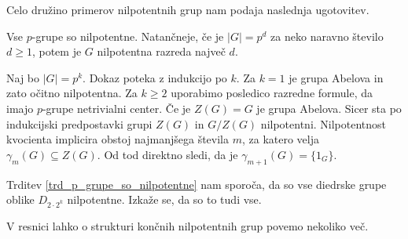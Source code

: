 Celo družino primerov nilpotentnih grup nam podaja naslednja ugotovitev.
\begin{trditev}
\label{trd_p_grupe_so_nilpotentne}
    Vse $p$-grupe so nilpotentne. Natančneje, če je $\lvert G \rvert  = p^{d}$ za neko naravno število $d \ge 1$, potem je $G$ nilpotentna razreda največ $d$. 
\end{trditev}
\begin{dokaz}
    Naj bo $\lvert G \rvert = p^k$. Dokaz poteka z indukcijo po $k$. Za $k = 1$ je grupa Abelova in zato očitno nilpotentna. Za $k \ge 2$ uporabimo posledico razredne formule, da imajo $p$-grupe netrivialni center.
    Če je $Z(G) = G$ je grupa Abelova. Sicer sta po indukcijski predpostavki grupi $Z(G)$ in $G / Z(G)$ nilpotentni. Nilpotentnost kvocienta implicira obstoj najmanjšega števila $m$, za katero velja $\gamma_m(G) \subseteq Z(G)$.
    Od tod direktno sledi, da je $\gamma_{m + 1}(G) = \{ 1_G \}$.
\end{dokaz}

\begin{primer}
Trditev \ref{trd_p_grupe_so_nilpotentne} nam sporoča, da so vse diedrske grupe oblike $D_{2 \cdot 2^{k}}$ nilpotentne. Izkaže se, da so to tudi vse. %
\end{primer}

V resnici lahko o strukturi končnih nilpotentnih grup povemo nekoliko več.

